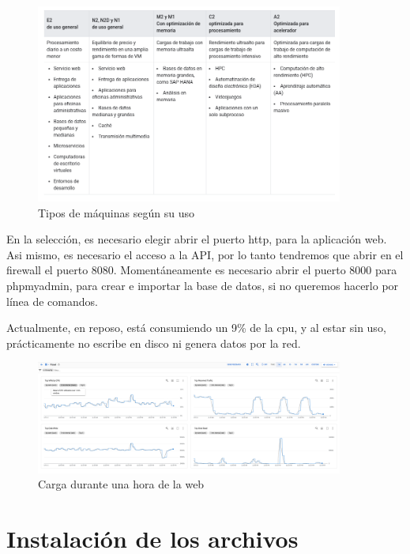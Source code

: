 \documentclass[11pt,spanish,listoffigures,listoftables]{tfgetsinf}
\begin{document}
\begin{figure}[h!] %
  \centering
   \includegraphics[width=0.90\textwidth]{img/cargas de trabajo.png}
   \caption{Tipos de máquinas según su uso}
   \label{fig:cargas}
 \end{figure}

 En la selección, es necesario elegir abrir el puerto http, para la aplicación web. Asi mismo, es necesario el acceso a la API, por lo tanto tendremos que abrir en el firewall el puerto 8080. 
 Momentáneamente es necesario abrir el puerto 8000 para phpmyadmin, para crear e importar la base de datos, si no queremos hacerlo por línea de comandos.

 Actualmente, en reposo, está consumiendo un 9\% de la cpu, y al estar sin uso, prácticamente no escribe en disco ni genera datos por la red.

 \begin{figure}[h!] %
  \centering
   \includegraphics[width=0.90\textwidth]{img/cargaGoogleCloud.png}
   \caption{Carga durante una hora de la web}
   \label{fig:cargaweb}
 \end{figure}

\section{Instalación de los archivos}
\end{document}
